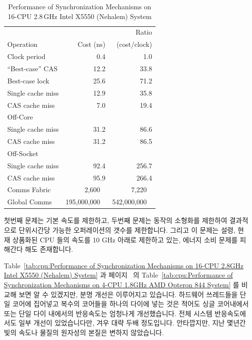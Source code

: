 {\begin{table}
\small
\centering
\begin{tabular}{l||r|r}
				& 	 	& Ratio \\
	Operation		& Cost (ns) 	& (cost/clock) \\
	\hline
	\hline
	Clock period		&           0.4	&           1.0 \\
	\hline
	``Best-case'' CAS	&          12.2	&          33.8 \\
	\hline
	Best-case lock		&          25.6	&          71.2 \\
	\hline
	Single cache miss	&          12.9	&          35.8 \\
	\hline
	CAS cache miss		&           7.0	&          19.4 \\
	\hline
	Off-Core		&		&		\\
	\hline
	Single cache miss	&          31.2	&          86.6 \\
	\hline
	CAS cache miss		&          31.2	&          86.5 \\
	\hline
	Off-Socket		&		&		\\
	\hline
	Single cache miss	&          92.4	&         256.7 \\
	\hline
	CAS cache miss		&          95.9	&         266.4 \\
	\hline
	Comms Fabric		&       2,600\textcolor{white}{.0}
						&	7,220\textcolor{white}{.0} \\
	\hline
	Global Comms		& 195,000,000\textcolor{white}{.0}
						& 542,000,000\textcolor{white}{.0} \\
\end{tabular}
\caption{Performance of Synchronization Mechanisms on 16-CPU 2.8\,GHz Intel X5550 (Nehalem) System}
\label{tab:cpu:Performance of Synchronization Mechanisms on 16-CPU 2.8GHz Intel X5550 (Nehalem) System}
\end{table}

	첫번째 문제는 기본 속도를 제한하고, 두번째 문제는 동작의 소형화를
	제한하여 결과적으로 단위시간당 가능한 오퍼레이션의 갯수를 제한합니다.
	그리고 이 문제는 설령, 현재 상품화된 CPU 들의 속도를 10 GHz 아래로
	제한하고 있는, 에너지 소비 문제를 피해간다 해도 존재합니다.

	Table~\ref{tab:cpu:Performance of Synchronization Mechanisms on 16-CPU
	2.8GHz Intel X5550 (Nehalem) System} 과
	페이지~\pageref{tab:cpu:Performance of Synchronization Mechanisms on
	4-CPU 1.8GHz AMD Opteron 844 System} 의 Table~\ref{tab:cpu:Performance
	of Synchronization Mechanisms on 4-CPU 1.8GHz AMD Opteron 844 System}
	를 비교해 보면 알 수 있겠지만, 분명 개선은 이루어지고 있습니다.
	하드웨어 쓰레드들을 단일 코어에 집어넣고 복수의 코어들을 하나의 다이에
	넣는 것은 적어도 싱글 코어내에서 또는 단일 다이 내에서의 반응속도는
	엄청나게 개선했습니다.
	전체 시스템 반응속도에서도 일부 개선이 있었습니다만, 겨우 대략 두배
	정도입니다.
	안타깝지만, 지난 몇년간 빛의 속도나 물질의 원자성의 본질은 변하지
	않았습니다.

}
